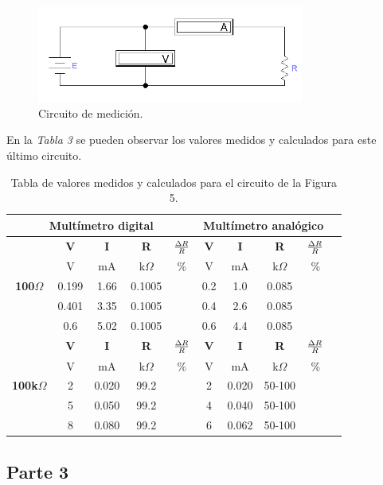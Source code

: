 \documentclass{article}
\begin{document}
\begin{figure}[h]
	\centering
	\includegraphics[width=0.78\textwidth]{images/p2-item-b.jpg}
	\caption{Circuito de medición.}
\end{figure}
\bigskip\bigskip


	En la \textit{Tabla 3} se pueden observar los valores medidos y calculados para este último circuito.
\bigskip

\begin{table}[!hbt]
	\begin{center}

		\begin{tabular}{|c|c|c|c|c|c|c|c|c|c|} \hline
			\multicolumn{5}{|c|}{\textbf{Multímetro digital}} & \multicolumn{4}{|c|}{\textbf{Multímetro analógico}} \\ \hline
			\multirow{5}{*}{\textbf{100$\Omega$}} 
			& \textbf{V} & \textbf{I} & \textbf{R} & \textbf{${\Delta R \over R}$} & \textbf{V} & \textbf{I} & \textbf{R} & \textbf{${\Delta R \over R}$} \\\cline{2-9}
			& V & mA & k$\Omega$ & \% & V & mA & k$\Omega$ & \% \\\cline{2-9}
			& 0.199 & 1.66 & 0.1005 &  & 0.2 & 1.0 & 0.085 &  \\\cline{2-9}
			& 0.401 & 3.35 & 0.1005 &  & 0.4 & 2.6 & 0.085 &  \\\cline{2-9}
			& 0.6 & 5.02 & 0.1005 &  & 0.6 & 4.4 & 0.085 &  \\ \hline
			\multirow{5}{*}{\textbf{100k$\Omega$}} 
			& \textbf{V} & \textbf{I} & \textbf{R} & \textbf{${\Delta R \over R}$} & \textbf{V} & \textbf{I} & \textbf{R} & \textbf{${\Delta R \over R}$} \\\cline{2-9}
			& V & mA & k$\Omega$ & \% & V & mA & k$\Omega$ & \% \\\cline{2-9}
			& 2 & 0.020 & 99.2 &  & 2 & 0.020 & 50-100 &  \\\cline{2-9}
			& 5 & 0.050 & 99.2 &  & 4 & 0.040 & 50-100 &  \\\cline{2-9}
			& 8 & 0.080 & 99.2 &  & 6 & 0.062 & 50-100 &  \\ \hline
		\end{tabular}

	\caption{Tabla de valores medidos y calculados para el circuito de la Figura 5.}
	\end{center}
\end{table}
\bigskip





\subsection{Parte 3}
\end{document}
